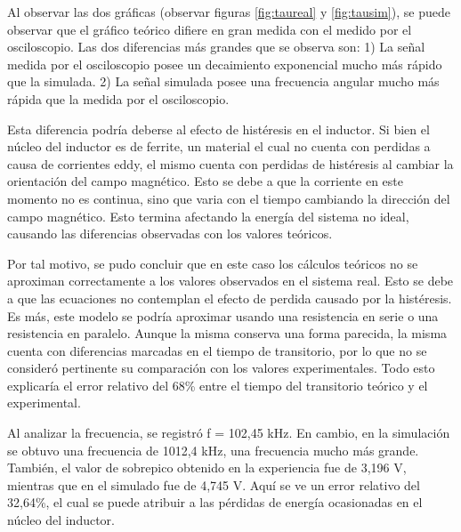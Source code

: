 \documentclass{article}
\begin{document}
   
  Al observar las dos gráficas (observar figuras \ref{fig:taureal} y \ref{fig:tausim}), se puede observar que el gráfico teórico difiere en gran medida con el medido por el osciloscopio. Las dos diferencias más grandes que se observa son: 1) La señal medida por el osciloscopio posee un decaimiento exponencial mucho más rápido que la simulada. 2) La señal simulada posee una frecuencia angular mucho más rápida que la medida por el osciloscopio. \par 
  Esta diferencia podría deberse al efecto de histéresis en el inductor. Si bien el núcleo del inductor es de ferrite, un material el cual no cuenta con perdidas a causa de corrientes eddy, el mismo cuenta con perdidas de histéresis al cambiar la orientación del campo magnético. Esto se debe a que la corriente en este momento no es continua, sino que varia con el tiempo cambiando la dirección del campo magnético. Esto termina afectando la energía del sistema no ideal, causando las diferencias observadas con los valores teóricos.\par
  Por tal motivo, se pudo concluir que en este caso los cálculos teóricos no se aproximan correctamente a los valores observados en el sistema real. Esto se debe a que las ecuaciones no contemplan el efecto de perdida causado por la histéresis. Es más, este modelo se podría aproximar usando una resistencia en serie o una resistencia en paralelo. Aunque la misma conserva una forma parecida, la misma cuenta con diferencias marcadas en el tiempo de transitorio, por lo que no se consideró pertinente su comparación con los valores experimentales. Todo esto explicaría el error relativo del 68\% entre el tiempo del transitorio teórico y el experimental.\par
  Al analizar la frecuencia, se registró f = 102,45 kHz. En cambio, en la simulación se obtuvo una frecuencia de 1012,4 kHz, una frecuencia mucho más grande. También, el valor de sobrepico obtenido en la experiencia fue de 3,196 V, mientras que en el simulado fue de 4,745 V. Aquí se ve un error relativo del 32,64\%, el cual se puede atribuir a las pérdidas de energía ocasionadas en el núcleo del inductor.
  
\end{document}
